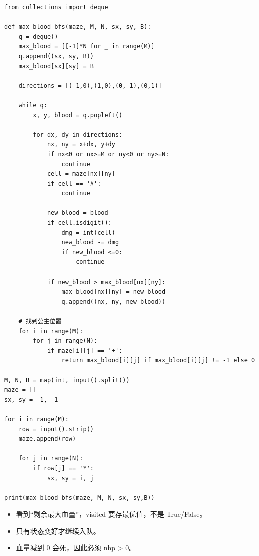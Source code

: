 \documentclass[10pt,a4paper,fontset=none]{ctexart}
\begin{document}
\begin{lstlisting}[style=py,caption={最终可用代码（对话来源）}]
from collections import deque

def max_blood_bfs(maze, M, N, sx, sy, B):
    q = deque()
    max_blood = [[-1]*N for _ in range(M)]
    q.append((sx, sy, B))
    max_blood[sx][sy] = B

    directions = [(-1,0),(1,0),(0,-1),(0,1)]

    while q:
        x, y, blood = q.popleft()

        for dx, dy in directions:
            nx, ny = x+dx, y+dy
            if nx<0 or nx>=M or ny<0 or ny>=N:
                continue
            cell = maze[nx][ny]
            if cell == '#':
                continue

            new_blood = blood
            if cell.isdigit():
                dmg = int(cell)
                new_blood -= dmg
                if new_blood <=0:
                    continue

            if new_blood > max_blood[nx][ny]:
                max_blood[nx][ny] = new_blood
                q.append((nx, ny, new_blood))

    # 找到公主位置
    for i in range(M):
        for j in range(N):
            if maze[i][j] == '+':
                return max_blood[i][j] if max_blood[i][j] != -1 else 0

M, N, B = map(int, input().split())
maze = []
sx, sy = -1, -1

for i in range(M):
    row = input().strip()
    maze.append(row)

    for j in range(N):
        if row[j] == '*':
            sx, sy = i, j

print(max_blood_bfs(maze, M, N, sx, sy,B))
\end{lstlisting}
\begin{notebox}
\begin{itemize}
  \item 看到“剩余最大血量”，visited 要存最优值，不是 True/False。
  \item 只有状态变好才继续入队。
  \item 血量减到 0 会死，因此必须 nhp > 0。
\end{itemize}
\end{notebox}
\end{document}
